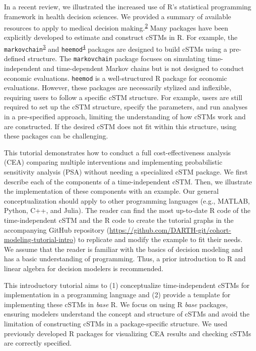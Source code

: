 \documentclass[
]{article}
\begin{document}
In a recent review, we illustrated the increased use of R's statistical programming framework in health decision sciences. We provided a summary of available resources to apply to medical decision making.\textsuperscript{\protect\hyperlink{ref-Jalal2017b}{2}} Many packages have been explicitly developed to estimate and construct cSTMs in R. For example, the \texttt{markovchain}\textsuperscript{\protect\hyperlink{ref-Spedicato2017}{3}} and \texttt{heemod}\textsuperscript{\protect\hyperlink{ref-Filipovic-Pierucci2017}{4}} packages are designed to build cSTMs using a pre-defined structure. The \texttt{markovchain} package focuses on simulating time-independent and time-dependent Markov chains but is not designed to conduct economic evaluations. \texttt{heemod} is a well-structured R package for economic evaluations. However, these packages are necessarily stylized and inflexible, requiring users to follow a specific cSTM structure. For example, users are still required to set up the cSTM structure, specify the parameters, and run analyses in a pre-specified approach, limiting the understanding of how cSTMs work and are constructed. If the desired cSTM does not fit within this structure, using these packages can be challenging.

This tutorial demonstrates how to conduct a full cost-effectiveness analysis (CEA) comparing multiple interventions and implementing probabilistic sensitivity analysis (PSA) without needing a specialized cSTM package. We first describe each of the components of a time-independent cSTM. Then, we illustrate the implementation of these components with an example. Our general conceptualization should apply to other programming languages (e.g., MATLAB, Python, C++, and Julia). The reader can find the most up-to-date R code of the time-independent cSTM and the R code to create the tutorial graphs in the accompanying GitHub repository (\url{https://github.com/DARTH-git/cohort-modeling-tutorial-intro}) to replicate and modify the example to fit their needs. We assume that the reader is familiar with the basics of decision modeling and has a basic understanding of programming. Thus, a prior introduction to R and linear algebra for decision modelers is recommended.

This introductory tutorial aims to (1) conceptualize time-independent cSTMs for implementation in a programming language and (2) provide a template for implementing these cSTMs in \emph{base} R. We focus on using R \emph{base} packages, ensuring modelers understand the concept and structure of cSTMs and avoid the limitation of constructing cSTMs in a package-specific structure. We used previously developed R packages for visualizing CEA results and checking cSTMs are correctly specified.
\end{document}
